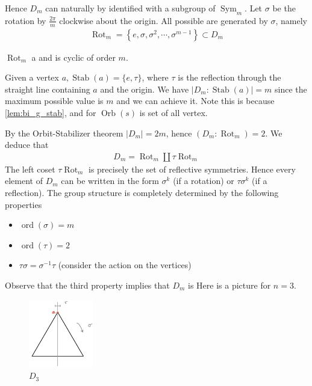 \documentclass{article}
\newcommand{\Sym}{\operatorname{Sym}}
\newcommand{\Stab}{\operatorname{Stab}}
\newcommand{\Orb}{\operatorname{Orb}}
\begin{document}
 Hence $D_{m}$ can naturally by identified with a subgroup of $\Sym_{m} .$ Let $\sigma$ be the rotation by $\frac{2 \pi}{m}$ clockwise about the origin. All possible  are generated by $\sigma$, namely
\begin{align*}
\operatorname{Rot}_{m}=\left\{e, \sigma, \sigma^{2}, \cdots, \sigma^{m-1}\right\} \subset D_{m}
\end{align*}
\begin{rema}
 $\operatorname{Rot}_{m}$ a  and is cyclic of order $m$.
\end{rema}

Given a vertex $a, \operatorname{Stab}(a)=\{e, \tau\}$, where $\tau$ is the reflection through the straight line containing $a$ and the origin. We have  $\left|D_{m}:\Stab(a)\right|=m$ since the maximum possible value is $m$ and we can achieve it. Note this is because \cref{lem:bi_g_stab}, and for $\Orb(s)$ is set of all vertex.

By the Orbit-Stabilizer theorem $\left|D_{m}\right|=2 m$, hence $\left(D_{m}:\operatorname{Rot}_{m}\right)=2$. We deduce that
\begin{align*}
D_{m}=\operatorname{Rot}_{m} \coprod \tau \operatorname{Rot}_{m}
\end{align*}
The left coset $\tau \operatorname{Rot}_{m}$ is precisely the set of reflective symmetries. Hence every element of $D_{m}$ can be written in the form $\sigma^{k}$ (if a rotation) or $\tau \sigma^{k}$ (if a reflection). The group structure is completely determined by the following properties
\begin{itemize}
    \item $\operatorname{ord}(\sigma)=m$
    \item  $\operatorname{ord}(\tau)=2$
    \item $\tau \sigma=\sigma^{-1} \tau$ (consider the action on the vertices)
\end{itemize}
Observe that the third property implies that $D_{m}$ is  Here is a picture for $n=3$.
\begin{figure}[h]
\caption{$D_3$}
\centering
\includegraphics[width=0.25\textwidth]{Figs/fig_Dihedral.png}
\end{figure}
\end{document}
